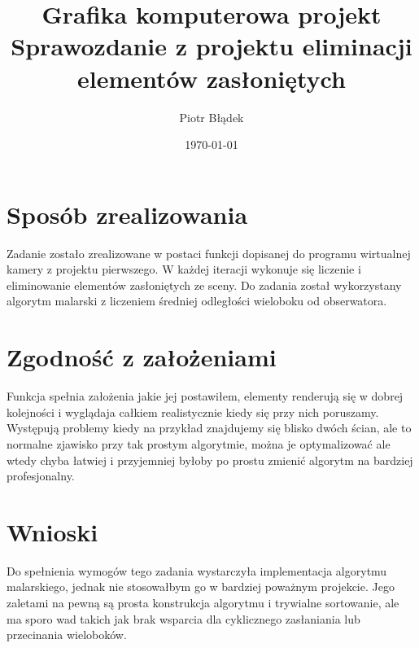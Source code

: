 \documentclass[a4paper,11pt,notitlepage]{article}
\author{Piotr Błądek}
\title{Grafika komputerowa projekt \\ Sprawozdanie z projektu eliminacji elementów zasłoniętych}
\date{\today}
\begin{document}
\maketitle

\section{Sposób zrealizowania}

Zadanie zostało zrealizowane w postaci funkcji dopisanej do programu wirtualnej kamery z projektu pierwszego. W każdej iteracji wykonuje się liczenie i eliminowanie elementów zasłoniętych ze sceny. Do zadania został wykorzystany algorytm malarski z liczeniem średniej odległości wieloboku od obserwatora. 

\section{Zgodność z założeniami}

Funkcja spełnia założenia jakie jej postawiłem, elementy renderują się w dobrej kolejności i wyglądaja całkiem realistycznie kiedy się przy nich poruszamy. Występują problemy kiedy na przykład znajdujemy się blisko dwóch ścian, ale to normalne zjawisko przy tak prostym algorytmie, można je optymalizować ale wtedy chyba łatwiej i przyjemniej byłoby po prostu zmienić algorytm na bardziej profesjonalny.

\section{Wnioski}

Do spełnienia wymogów tego zadania wystarczyła implementacja algorytmu malarskiego, jednak nie stosowałbym go w bardziej poważnym projekcie. Jego zaletami na pewną są prosta konstrukcja algorytmu i trywialne sortowanie, ale ma sporo wad takich jak brak wsparcia dla cyklicznego zasłaniania lub przecinania wieloboków. 
\end{document}
